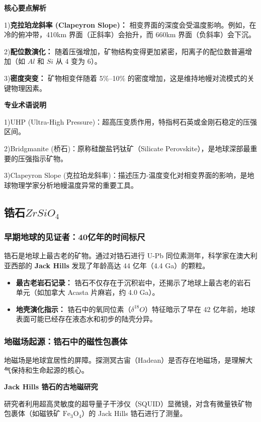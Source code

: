 \documentclass[12pt,a4paper]{article}
\begin{document}
	\textbf{核心要点解析}

		1)\textbf{克拉珀龙斜率 (Clapeyron Slope)：} 相变界面的深度会受温度影响。例如，在冷的俯冲带，410km 界面（正斜率）会抬升，而 660km 界面（负斜率）会下沉。
		
		2)\textbf{配位数演化：} 随着压强增加，矿物结构变得更加紧密，阳离子的配位数普遍增加（如 $Al$ 和 $Si$ 从 4 变为 6）。
		
		3)\textbf{密度突变：} 矿物相变伴随着 5\%--10\% 的密度增加，这是维持地幔对流模式的关键物理因素。
		
	\textbf{专业术语说明}
	
	1)UHP (Ultra-High Pressure)：超高压变质作用，特指柯石英或金刚石稳定的压强区间。
	
	2)Bridgmanite (桥石)：原称硅酸盐钙钛矿（Silicate Perovskite），是地球深部最重要的压强指示矿物。
	
	3)Clapeyron Slope (克拉珀龙斜率)：描述压力-温度变化对相变界面的影响，是地球物理学家分析地幔温度异常的重要工具。
	
	\subsection{锆石$ZrSiO_4$}
	
	\subsubsection{早期地球的见证者：40亿年的时间标尺}
	锆石是地球上最古老的矿物。通过对锆石进行 U-Pb 同位素测年，科学家在澳大利亚西部的 \textbf{Jack Hills} 发现了年龄高达 44 亿年（4.4 Ga）的颗粒。
	
	\begin{itemize}
		\item \textbf{最古老岩石记录：} 锆石不仅存在于沉积岩中，还揭示了地球上最古老的岩石单元（如加拿大 Acasta 片麻岩，约 4.0 Ga）。
		\item \textbf{地壳演化指示：} 锆石中的氧同位素（$\delta^{18}O$）特征暗示了早在 42 亿年前，地球表面可能已经存在液态水和初步的陆壳分异。
	\end{itemize}
	
	\subsubsection{地磁场起源：锆石中的磁性包裹体}
	地磁场是地球宜居性的屏障。探测冥古宙（Hadean）是否存在地磁场，是理解大气保持和生命起源的核心。
	
	\textbf{Jack Hills 锆石的古地磁研究}
	
	研究者利用超高灵敏度的超导量子干涉仪（SQUID）显微镜，对含有微量铁矿物包裹体（如磁铁矿 $\text{Fe}_3\text{O}_4$）的 Jack Hills 锆石进行了测量。
	
\end{document}
